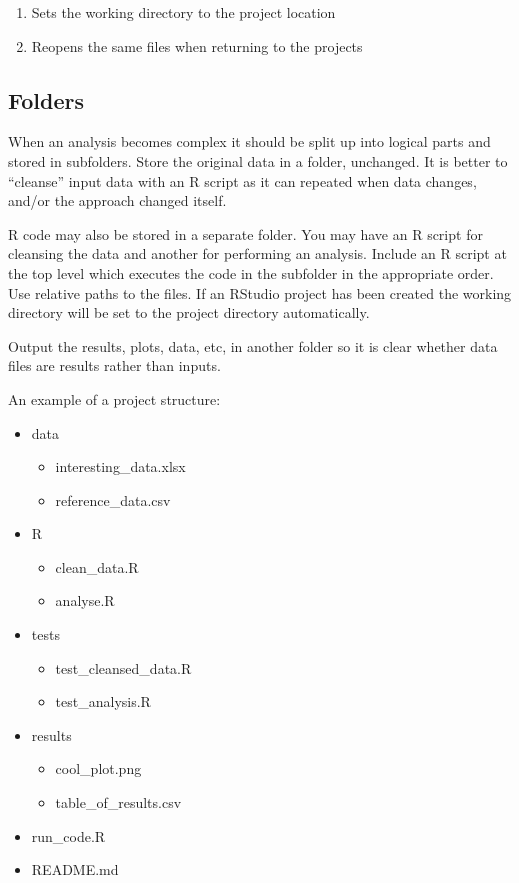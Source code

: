 \documentclass[]{book}
\providecommand{\tightlist}{%
  \setlength{\itemsep}{0pt}\setlength{\parskip}{0pt}}
\theoremstyle{definition}
\theoremstyle{definition}
\theoremstyle{definition}
\theoremstyle{remark}
\begin{document}
\begin{enumerate}
\def\labelenumi{\arabic{enumi}.}
\tightlist
\item
  Sets the working directory to the project location
\item
  Reopens the same files when returning to the projects
\end{enumerate}

\subsection{Folders}\label{folders}

When an analysis becomes complex it should be split up into logical
parts and stored in subfolders. Store the original data in a folder,
unchanged. It is better to ``cleanse'' input data with an R script as it
can repeated when data changes, and/or the approach changed itself.

R code may also be stored in a separate folder. You may have an R script
for cleansing the data and another for performing an analysis. Include
an R script at the top level which executes the code in the subfolder in
the appropriate order. Use relative paths to the files. If an RStudio
project has been created the working directory will be set to the
project directory automatically.

Output the results, plots, data, etc, in another folder so it is clear
whether data files are results rather than inputs.

An example of a project structure:

\begin{itemize}
\tightlist
\item
  data

  \begin{itemize}
  \tightlist
  \item
    interesting\_data.xlsx
  \item
    reference\_data.csv
  \end{itemize}
\item
  R

  \begin{itemize}
  \tightlist
  \item
    clean\_data.R
  \item
    analyse.R
  \end{itemize}
\item
  tests

  \begin{itemize}
  \tightlist
  \item
    test\_cleansed\_data.R
  \item
    test\_analysis.R
  \end{itemize}
\item
  results

  \begin{itemize}
  \tightlist
  \item
    cool\_plot.png
  \item
    table\_of\_results.csv
  \end{itemize}
\item
  run\_code.R
\item
  README.md
\end{itemize}
\end{document}
